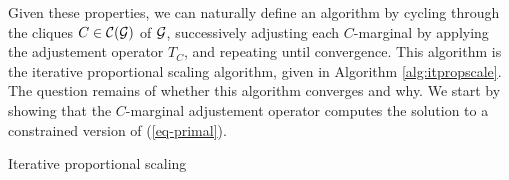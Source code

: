 Given these properties, we can naturally define an algorithm by cycling through the cliques $C \in {\mathcal{C}}({\mathcal{G}})$ of ${\mathcal{G}}$, successively adjusting each $C$-marginal by applying the adjustement operator $T_C$, and repeating until convergence. This algorithm is the iterative proportional scaling algorithm, given in Algorithm \ref{alg:itpropscale}. The question remains of whether this algorithm converges and why. We start by showing that the $C$-marginal adjustement operator computes the solution to a constrained version of (\ref{eq-primal}).

\begin{algorithm}[ht!]
    \caption{Iterative proportional scaling}
    \label{alg:itpropscale}
    \begin{algorithmic}[1]
    
        \EndFor
        \Else
        \EndIf
    \end{algorithmic}
\end{algorithm}

